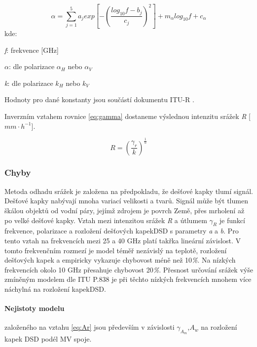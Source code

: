 \documentclass[a4paper,12pt]{article}
\begin{document}
\begin{equation}
\alpha=\sum_{j=1}^{5} a_{j} exp\left [ -\left ( \frac{log_{10}f-b_{j}}{c_{j}} \right )^{2} \right ]+m{_{\alpha }}log_{10}f+c_{\alpha }
\end{equation}
kde:

\emph{f}: frekvence [GHz]

\emph{$\alpha$}:  dle polarizace \emph{$\alpha_{H}$} nebo \emph{$\alpha_{V}$}

\emph{k}: dle polarizace  \emph{$k_{H}$} nebo \emph{$k_{V}$}

{\raggedright{}Hodnoty pro dané konstanty jsou součástí dokumentu ITU-R \cite{itu}.}
\bigskip

{\raggedright{}Inverzním vztahem rovnice \eqref{eq:gamma} dostaneme výslednou intenzitu srážek \emph{R} [$mm \cdot h^{-1}$]. }


\begin{equation}
R=\left ( \frac{\gamma_{r}}{k} \right )^{\frac{1}{\alpha }}
\end{equation}


\subsubsection{Chyby}
\label{subsec:chyby}
Metoda odhadu srážek je založena na předpokladu, že dešťové kapky tlumí signál. Dešťové kapky nabývají mnoha variací velikosti a tvarů. Signál může být tlumen škálou objektů od vodní páry, jejímž zdrojem je povrch Země, přes mrholení až po velké dešťové kapky. Vztah mezi intenzitou srážek \emph{R} a útlumem \emph{$\gamma_{R} $} je funkcí frekvence, polarizace a rozložení dešťových kapek\acs{DSD} s parametry \emph{a} a \emph{b}. Pro tento vztah na frekvencích mezi 25 a 40 GHz platí takřka lineární závislost. V tomto frekvenčním rozmezí je model téměř nezávislý na teplotě, rozložení dešťových kapek a empiricky vykazuje chybovost méně než 10\emph{\%}. Na nízkých frekvencích okolo 10 GHz přesahuje chybovost 20\emph{\%}. Přesnost určování srážek výše zmíněným modelem dle ITU P.838 je při těchto nízkých frekvencích mnohem více náchylná na rozložení kapek\acs{DSD}.\cite{dsd} 


\paragraph*{Nejistoty modelu} založeného na vztahu \eqref{eq:Ar} jsou především v závislosti \emph{$\gamma_{A_{m}} $},\emph{$A_{w} $} na rozložení kapek \acs{DSD} podél MV spoje.
\end{document}

